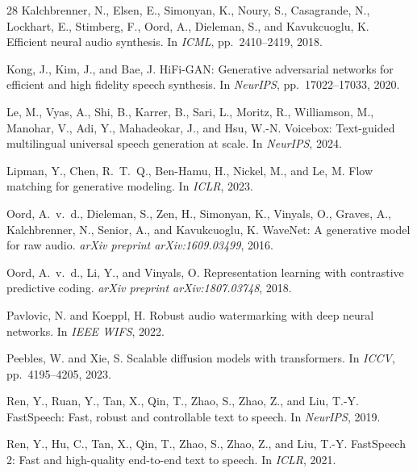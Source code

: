 \documentclass[11pt,a4paper]{article}
\begin{document}
\begin{thebibliography}{28}
Kalchbrenner, N., Elsen, E., Simonyan, K., Noury, S., Casagrande, N., Lockhart, E., Stimberg, F., Oord, A., Dieleman, S., and Kavukcuoglu, K.
\newblock Efficient neural audio synthesis.
\newblock In \emph{ICML}, pp.\ 2410--2419, 2018.

Kong, J., Kim, J., and Bae, J.
\newblock HiFi-GAN: Generative adversarial networks for efficient and high fidelity speech synthesis.
\newblock In \emph{NeurIPS}, pp.\ 17022--17033, 2020.

Le, M., Vyas, A., Shi, B., Karrer, B., Sari, L., Moritz, R., Williamson, M., Manohar, V., Adi, Y., Mahadeokar, J., and Hsu, W.-N.
\newblock Voicebox: Text-guided multilingual universal speech generation at scale.
\newblock In \emph{NeurIPS}, 2024.

Lipman, Y., Chen, R.~T.~Q., Ben-Hamu, H., Nickel, M., and Le, M.
\newblock Flow matching for generative modeling.
\newblock In \emph{ICLR}, 2023.

Oord, A.~v.~d., Dieleman, S., Zen, H., Simonyan, K., Vinyals, O., Graves, A., Kalchbrenner, N., Senior, A., and Kavukcuoglu, K.
\newblock WaveNet: A generative model for raw audio.
\newblock \emph{arXiv preprint arXiv:1609.03499}, 2016.

Oord, A.~v.~d., Li, Y., and Vinyals, O.
\newblock Representation learning with contrastive predictive coding.
\newblock \emph{arXiv preprint arXiv:1807.03748}, 2018.

Pavlovic, N. and Koeppl, H.
\newblock Robust audio watermarking with deep neural networks.
\newblock In \emph{IEEE WIFS}, 2022.

Peebles, W. and Xie, S.
\newblock Scalable diffusion models with transformers.
\newblock In \emph{ICCV}, pp.\ 4195--4205, 2023.

Ren, Y., Ruan, Y., Tan, X., Qin, T., Zhao, S., Zhao, Z., and Liu, T.-Y.
\newblock FastSpeech: Fast, robust and controllable text to speech.
\newblock In \emph{NeurIPS}, 2019.

Ren, Y., Hu, C., Tan, X., Qin, T., Zhao, S., Zhao, Z., and Liu, T.-Y.
\newblock FastSpeech 2: Fast and high-quality end-to-end text to speech.
\newblock In \emph{ICLR}, 2021.


\end{thebibliography}
\end{document}
